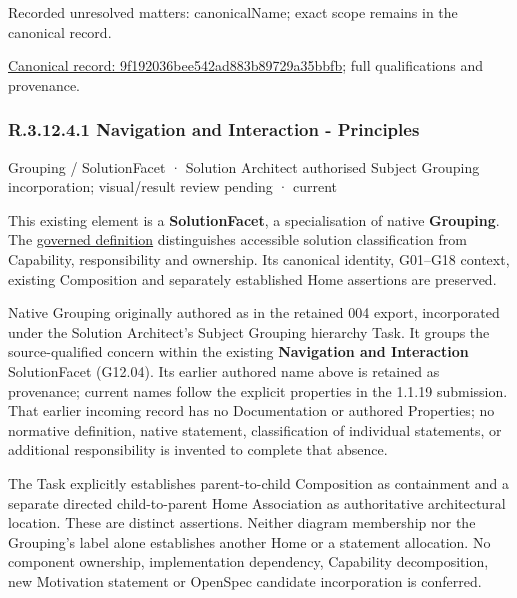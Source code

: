 {\small Recorded unresolved matters: canonicalName; exact scope remains in the canonical record.}\par
{\footnotesize \href{../../../../../../../continuum/grouping/9f192036bee542ad883b89729a35bbfb.md}{Canonical record: 9f192036bee542ad883b89729a35bbfb}; full qualifications and provenance.}\par
\subsubsection*{R.3.12.4.1 Navigation and Interaction - Principles}
\label{navigation:R.3.12.4.1}

\label{element:5120fbb391e24b3f941d8a5cc347a1fd}
{\small Grouping / SolutionFacet · Solution Architect authorised Subject Grouping incorporation; visual/result review pending · current}\par

This existing element is a \textbf{SolutionFacet}, a specialisation of native
\textbf{Grouping}. The \href{\detokenize{../../../../../../../governance/continuum-representation.md#solutionfacet-classification--1119-candidate}}{governed definition}
distinguishes accessible solution classification from Capability, responsibility
and ownership. Its canonical identity, G01–G18 context, existing Composition
and separately established Home assertions are preserved.



Native Grouping originally authored as \texttt{} in the retained 004 export,
incorporated under the Solution Architect's Subject Grouping hierarchy Task.
It groups the source-qualified \texttt{} concern within
the existing \textbf{Navigation and Interaction} SolutionFacet (G12.04). Its earlier authored name above is retained as provenance; current names
follow the explicit properties in the 1.1.19 submission.
That earlier incoming record has no Documentation or authored Properties; no normative
definition, native statement, classification of individual statements, or
additional responsibility is invented to complete that absence.



The Task explicitly establishes parent-to-child Composition as containment and
a separate directed child-to-parent Home Association as authoritative architectural
location. These are distinct assertions. Neither diagram membership nor the
Grouping's label alone establishes another Home or a statement allocation.
No component ownership, implementation dependency, Capability decomposition,
new Motivation statement or OpenSpec candidate incorporation is conferred.



